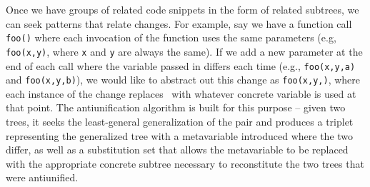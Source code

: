 Once we have groups of related code snippets in the form of related subtrees,
we can seek patterns that relate changes.  For example, say we have a function
call {\tt foo()} where each invocation of the function uses the same parameters
(e.g, {\tt foo(x,y)}, where {\tt x} and {\tt y} are always the same). If we add
a new parameter at the end of each call where the variable passed in differs
each time (e.g., {\tt foo(x,y,a)} and {\tt foo(x,y,b)}), we would like to
abstract out this change as {\tt foo(x,y,\metavar)}, where each instance of the
change replaces \metavar~with whatever concrete variable is used at that point.
The antiunification algorithm is built for this purpose -- given two trees, it
seeks the least-general generalization of the pair and produces a triplet
representing the generalized tree with a metavariable introduced where the two
differ, as well as a substitution set that allows the metavariable to be
replaced with the appropriate concrete subtree necessary to reconstitute the
two trees that were antiunified.
